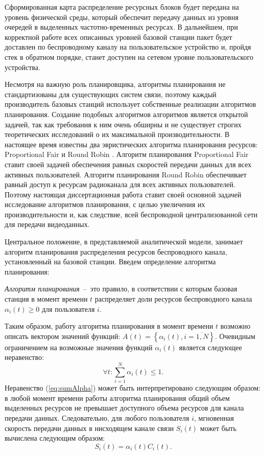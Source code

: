 Сформированная карта распределение ресурсных блоков будет передана на уровень физической среды, который обеспечит передачу данных из уровня очередей в выделенных частотно-временных ресурсах. В дальнейшем, при корректной работе всех описанных уровней базовой станции пакет будет доставлен по беспроводному каналу на пользовательское устройство и, пройдя стек в обратном порядке, станет доступен на сетевом уровне пользовательского устройства.

Несмотря на важную роль планировщика, алгоритмы планирования не стандартизованы для существующих систем связи, поэтому каждый производитель базовых станций использует собственные реализации алгоритмов планирования. Создание подобных алгоритмов алгоритмов является открытой задачей, так как требования к ним очень обширны и не существует строгих теоретических исследований о их максимальной производительности. В настоящее время известны два эвристических алгоритма планирования ресурсов: Proportional Fair \cite{1310314} и Round Robin \cite{miao_zander_sung_ben_slimane_2016}. Алгоритм планирования Proportional Fair ставит своей задачей обеспечения равных скоростей передачи данных для всех активных пользователей. Алгоритм планирования Round Robin обеспечивает равный доступ к ресурсам радиоканала для всех активных пользователей. Поэтому настоящая диссертационная работа ставит своей основной задачей исследование алгоритмов планирования, с целью увеличения их производительности и, как следствие, всей беспроводной централизованной сети для передачи видеоданных.

Центральное положение, в представляемой аналитической модели, занимает алгоритм планирования распределения ресурсов беспроводного канала, установленный на базовой станции. Введем определение алгоритма планирования:

\begin{definition}
\label{def:SchedulingAlg}
    \emph{Алгоритм планирования}~--~это правило, в соответствии с которым базовая станция в момент времени $t$ распределяет доли ресурсов беспроводного канала $\alpha_i(t) \geq 0$ для пользователя $i$.
\end{definition}

Таким образом, работу алгоритма планирования в момент времени $t$ возможно описать вектором значений функций: ${A}(t) = \left\{\alpha_{i}(t), i = \overline{1,N}\right\}$. Очевидным ограничением на возможные значения функций $\alpha_i(t)$ является следующее неравенство:
\begin{equation}
\forall t: \sum\limits_{i=1}^{N}\alpha_{i}(t) \leq 1.
\label{eq:sumAlpha}
\end{equation}
Неравенство (\ref{eq:sumAlpha}) может быть интерпретировано следующим образом: в любой момент времени работы алгоритма планирования общий объем выделенных ресурсов не превышает доступного объема ресурсов для канала передачи данных. Следовательно, для любого пользователя $i$, мгновенная скорость передачи данных в нисходящем канале связи $S_i(t)$ может быть вычислена следующим образом:
\begin{equation}
S_i(t) = \alpha_i(t) C_i(t).
\label{eq:MomentRate}
\end{equation}

